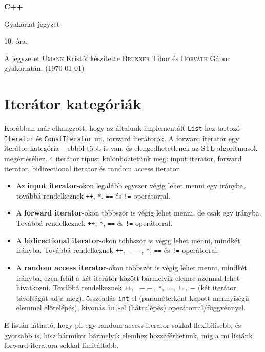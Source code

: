 \documentclass[a4paper,11.5pt,table]{article}
\begin{document}
	\setlength\parindent{0pt}
	\def\<{<\hspace{0mm}<}
	
	\theoremstyle{definition}
	\newtheorem{note}{Megjegyzés}[subsection]
	
	\begin{center}
		{\LARGE\textbf{C++}}
		
		{\Large Gyakorlat jegyzet}
		
		10. óra.
	\end{center}
	A jegyzetet \textsc{Umann} Kristóf készítette \textsc{Brunner} Tibor és \textsc{Horváth} Gábor gyakorlatán. (\today)
	\section{Iterátor kategóriák}
	Korábban már elhangzott, hogy az általunk implementált \texttt{List}-hez tartozó \texttt{Iterator} és \texttt{ConstIterator} un. forward iterátorok. A forward iterator egy iterátor kategória -- ebből több is van, és elengedhetetlenek az STL algoritmusok megértéséhez. 4 iterátor típust különböztetünk meg: input iterator, forward iterator, bidirectional iterator és random access iterator.
	\begin{itemize}
		\item Az \textbf{input iterator}-okon legalább egyszer végig lehet menni egy irányba, továbbá rendelkeznek \texttt{++}, \texttt{*}, \texttt{==} és \texttt{!=} operátorral.
		\item A \textbf{forward iterator}-okon többször is végig lehet menni, de csak egy irányba. Továbbá rendelkeznek \texttt{++}, \texttt{*}, \texttt{==} és \texttt{!=} operátorral.
		\item A \textbf{bidirectional iterator}-okon többször is végig lehet menni, mindkét irányba. Továbbá rendelkeznek \texttt{++}, \texttt{$--$}, \texttt{*}, \texttt{==} és \texttt{!=} operátorral.
		\item A \textbf{random access iterator}-okon többször is végig lehet menni, mindkét irányba, ezen felül a két iterátor között bármelyik elemre azonnal lehet hivatkozni. Továbbá rendelkeznek \texttt{++}, \texttt{
		$--$}, \texttt{*}, \texttt{==}, \texttt{!=}, \texttt{$-$} (két iterátor távolságát adja meg), összeadás \texttt{int}-el (paraméterként kapott mennyiségű elemmel előrelépés), kivonás \texttt{int}-el (hátralépés) operátorral/függvénnyel.
	\end{itemize}
	E listán látható, hogy pl. egy random access iterator sokkal flexibilisebb, és gyorsabb is, hisz bármikor bármelyik elemhez hozzáférhetünk, míg a mi listánk forward iteratora sokkal limitáltabb.
	
\end{document}
